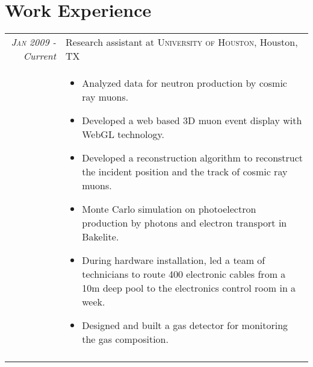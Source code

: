\documentclass[11pt]{article} %
\begin{document}
\section{Work Experience}

\begin{tabular}{r|p{12cm}}
\emph{\textsc{Jan 2009} - Current} & Research assistant at \textsc{University of Houston}, Houston, TX \\
& \small
\begin{itemize}
  \item	Analyzed data for neutron production by cosmic ray muons.
  \item Developed a web based 3D muon event display with WebGL technology.
  \item Developed a reconstruction algorithm to reconstruct the incident position and the track of cosmic ray muons.
  \item Monte Carlo simulation on photoelectron production by photons and electron transport in Bakelite.
  \item During hardware installation, led a team of technicians to route 400 electronic cables from a 10m deep pool to the electronics control room in a week.
  \item Designed and built a gas detector for monitoring the gas composition.
\end{itemize}\\
\multicolumn{2}{c}{} \\
\end{tabular}\newpage
\end{document}
